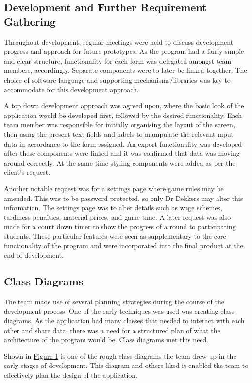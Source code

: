 \documentclass{l3proj}
\begin{document}
\subsection{Development and Further Requirement Gathering}
Throughout development, regular meetings were held to discuss development progress and approach for future prototypes. As the program had a fairly simple and clear structure, functionality for each form was delegated amongst team members, accordingly. Separate components were to later be linked together. The choice of software language and supporting mechanisms/libraries was key to accommodate for this development approach.

A top down development approach was agreed upon, where the basic look of the application would be developed first, followed by the desired functionality. Each team member was responsible for initially organising the layout of the screen, then using the present text fields and labels to manipulate the relevant input data in accordance to the form assigned. An export functionality was  developed after these components were linked and it was confirmed that data was moving around correctly. At the same time styling components were added as per the client's request.

Another notable request was for a settings page where game rules may be amended. This was to be password protected, so only Dr Dekkers may alter this information. The settings page was to alter details such as wage schemes, tardiness penalties, material prices, and game time. A later request was also made for a count down timer to show the progress of a round to participating students.  These particular features were seen as supplementary to the core functionality of the program  and were incorporated into the final product at the end of development.

\subsection{Class Diagrams}
The team made use of several planning strategies during the course of the development process. One of the early techniques was used was creating class diagrams. As the application had many classes that needed to interact with each other and share data, there was a need for a structured plan of what the architecture of the program would be. Class diagrams met this need.



Shown in \hyperref[fig:class]{Figure 1} is one of the rough class diagrams the team drew up in the early stages of development. This diagram and others liked it enabled the team to effectively plan the design of the application.
\end{document}
